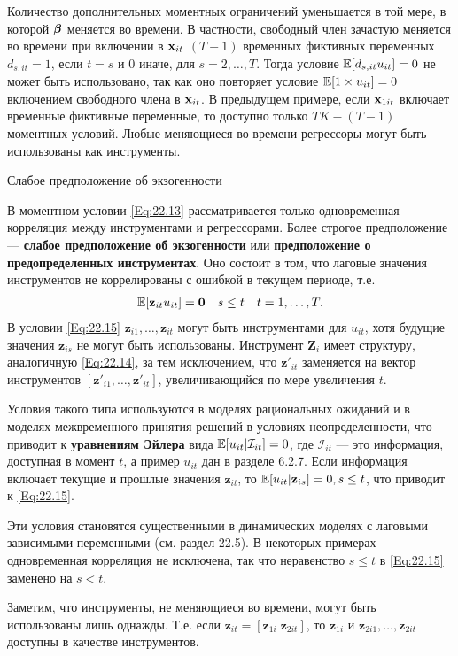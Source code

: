Количество дополнительных моментных ограничений уменьшается в той мере, в которой $\bm{\beta}$ меняется во времени. В частности, свободный член зачастую меняется во времени при включении в $\mathbf{x}_{it}$ $(T-1)$ временных фиктивных переменных $d_{s,it}=1$, если $t=s$ и 0 иначе, для $s=2, \dots, T$. Тогда условие $\mathbb{E}[d_{s,it} u_{it}]=0$ не может быть использовано, так как оно повторяет условие $\mathbb{E}[1 \times u_{it}]=0$ включением свободного члена в $\mathbf{x}_{it}$. В предыдущем примере, если $\mathbf{x}_{1it}$ включает временные фиктивные переменные, то доступно только $TK-(T-1)$ моментных условий. Любые меняющиеся во времени регрессоры могут быть использованы как инструменты.

{\centering  Слабое предположение об экзогенности}


В моментном условии \ref{Eq:22.13} рассматривается только одновременная корреляция между инструментами и регрессорами. Более строгое предположение  --- \textbf{слабое предположение об экзогенности} или \textbf{предположение о предопределенных  инструментах}. Оно состоит в том, что лаговые значения инструментов не коррелированы с ошибкой в текущем периоде, т.е.
\begin{align}
&\mathbb{E} [\mathbf z_{it} u_{it}] =\mathbf 0
& s \leq t &
& t=1, \dots, T.
\label{Eq:22.15}
\end{align}
В условии \ref{Eq:22.15} $\mathbf z_{i1}, \dots, \mathbf z_{it}$ могут быть инструментами для $u_{it}$, хотя будущие значения $\mathbf z_{is}$ не могут быть использованы. Инструмент $ \mathbf Z_i$ имеет структуру, аналогичную \ref{Eq:22.14}, за тем исключением, что $\mathbf z'_{it}$  заменяется на вектор инструментов $[\mathbf z'_{i1}, \dots, \mathbf z'_{it}]$, увеличивающийся по мере увеличения $t$.

Условия такого типа используются в моделях рациональных ожиданий и в моделях межвременного принятия решений в условиях неопределенности, что приводит к \textbf{уравнениям Эйлера} вида $\mathbb{E}[u_{it} | \mathcal I_{it}]=0$, где $\mathcal I_{it}$ --- это информация, доступная в момент $t$, а пример $u_{it}$ дан в разделе 6.2.7. Если информация включает текущие и прошлые значения $\mathbf z_{it}$, то $\mathbb{E}[u_{it} | \mathbf z_{is}]=0, s \leq t$, что приводит к \ref{Eq:22.15}.

Эти условия становятся существенными в динамических моделях с лаговыми зависимыми переменными (см. раздел 22.5). В некоторых примерах одновременная корреляция не исключена, так что неравенство $s \leq t$ в \ref{Eq:22.15} заменено на $s < t$.

Заметим, что инструменты, не меняющиеся во времени, могут быть использованы лишь однажды. Т.е. если $\mathbf z_{it} = [ \mathbf z_{1i} \; \mathbf z_{2it}]$, то $\mathbf z_{1i}$ и $\mathbf z_{2i1}, \dots, \mathbf z_{2it}$ доступны в качестве инструментов.

